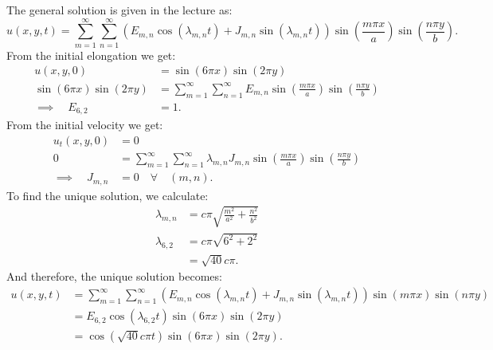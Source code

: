 \begin{derivation}
  The general solution is given in the lecture as:
  \[ 
  u(x,y,t) = \sum_{m = 1}^{\infty} \sum_{n = 1}^{\infty} \left( E_{m,n} \cos \left( \lambda_{m,n} t \right) + J_{m,n} \sin \left( \lambda_{m,n}t \right)\right) \sin \left( \frac{m \pi x}{a} \right) \sin \left( \frac{n \pi y}{b} \right)
  .\]
  From the initial elongation we get:
  \begin{align*}
    u(x,y,0) &= \sin (6 \pi x) \sin (2 \pi y) \\
    \sin (6\pi x) \sin (2 \pi y) &= \sum_{m = 1}^{\infty} \sum_{n = 1}^{\infty}  E_{m,n} \sin \left( \frac{m \pi x}{a} \right) \sin \left( \frac{n \pi y}{b} \right) \\
    \implies \quad E_{6,2} &= 1
  .\end{align*}
  From the initial velocity we get:
  \begin{align*}
    u_t(x,y,0) &= 0 \\
    0 &= \sum_{m = 1}^{\infty} \sum_{n = 1}^{\infty} \lambda_{m,n}J_{m,n} \sin \left( \frac{m \pi x}{a} \right) \sin \left( \frac{n \pi y}{b} \right) \\
    \implies \quad J_{m,n} &= 0 \quad  \forall \quad(m,n)
  .\end{align*}
  To find the unique solution, we calculate:
  \begin{align*}
    \lambda_{m,n} &= c\pi \sqrt{\frac{m^2}{a^2} + \frac{n^2}{b^2}} \\
    \lambda_{6,2}&= c \pi \sqrt{6^2 + 2^2} \\
                 &= \sqrt{40}c \pi
  .\end{align*}
  And therefore, the unique solution becomes:
  \begin{align*}
    u(x,y,t) &= \sum_{m = 1}^{\infty} \sum_{n = 1}^{\infty}  \left( E_{m,n} \cos \left( \lambda_{m,n}t \right) + J_{m,n} \sin \left( \lambda_{m,n}t \right) \right) \sin \left( m\pi x \right) \sin \left( n \pi y \right) \\
             &= E_{6,2} \cos \left( \lambda_{6,2}t \right) \sin \left( 6 \pi x \right) \sin \left( 2\pi y \right) \\
             &= \cos \left( \sqrt{40} c\pi t \right) \sin \left( 6 \pi x \right) \sin \left( 2 \pi y \right)
  .\end{align*}



\end{derivation}
